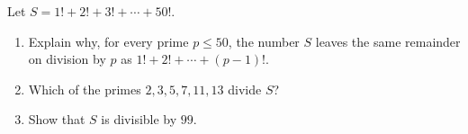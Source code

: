 Let $S=1!+2!+3!+\cdots+50!$.
\begin{enumerate}
\item[(a)] Explain why, for every prime $p\le50$, the number $S$ leaves the same remainder on division by $p$ as $1!+2!+\cdots+(p-1)!$.
\item[(b)] Which of the primes $2,3,5,7,11,13$ divide $S$?
\item[(c)] Show that $S$ is divisible by $99$.
\end{enumerate}
